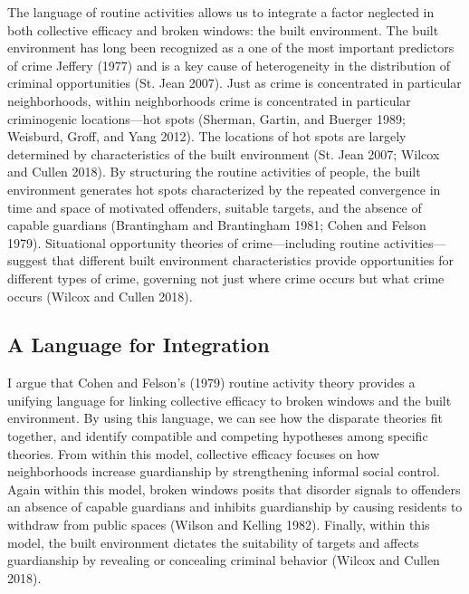 \documentclass [11pt, proquest] {uwthesis}[2015/03/03]
\begin{document}
The language of routine activities allows us to integrate a factor neglected in both collective efficacy and broken windows: the built environment. The built environment has long been recognized as a one of the most important predictors of crime Jeffery (1977) and is a key cause of heterogeneity in the distribution of criminal opportunities (St. Jean 2007). Just as crime is concentrated in particular neighborhoods, within neighborhoods crime is concentrated in particular criminogenic locations---hot spots (Sherman, Gartin, and Buerger 1989; Weisburd, Groff, and Yang 2012). The locations of hot spots are largely determined by characteristics of the built environment (St. Jean 2007; Wilcox and Cullen 2018). By structuring the routine activities of people, the built environment generates hot spots characterized by the repeated convergence in time and space of motivated offenders, suitable targets, and the absence of capable guardians (Brantingham and Brantingham 1981; Cohen and Felson 1979). Situational opportunity theories of crime---including routine activities---suggest that different built environment characteristics provide opportunities for different types of crime, governing not just where crime occurs but what crime occurs (Wilcox and Cullen 2018).

\hypertarget{a-language-for-integration}{%
\subsection{A Language for Integration}\label{a-language-for-integration}}

I argue that Cohen and Felson's (1979) routine activity theory provides a unifying language for linking collective efficacy to broken windows and the built environment. By using this language, we can see how the disparate theories fit together, and identify compatible and competing hypotheses among specific theories. From within this model, collective efficacy focuses on how neighborhoods increase guardianship by strengthening informal social control. Again within this model, broken windows posits that disorder signals to offenders an absence of capable guardians and inhibits guardianship by causing residents to withdraw from public spaces (Wilson and Kelling 1982). Finally, within this model, the built environment dictates the suitability of targets and affects guardianship by revealing or concealing criminal behavior (Wilcox and Cullen 2018).
\end{document}
